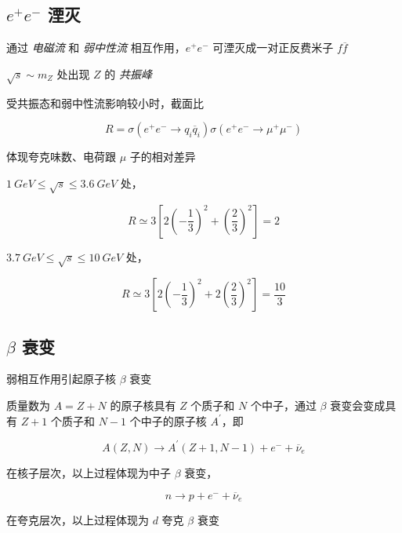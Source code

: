 \documentclass[oneside,a4paper,openany,11pt]{ctexbook}
\begin{document}
\subsection{\texorpdfstring{$e^+e^-$}{e+e-} 湮灭}

通过 \emph{电磁流} 和 \emph{弱中性流} 相互作用，$e^+ e^-$ 可湮灭成一对正反费米子 $f \overline{f}$

$\sqrt{s} \sim m_Z$ 处出现 $Z$ 的 \emph{共振峰}

受共振态和弱中性流影响较小时，截面比

\begin{equation}
    R = \sigma(e^+ e^- \to q_i \overline{q}_i ) \sigma(e^+ e^- \to \mu^+ \mu^-)
\end{equation}

体现夸克味数、电荷跟 $\mu$ 子的相对差异

$1\ GeV \le \sqrt{s} \le 3.6\ GeV$ 处，

\begin{equation}
    R \simeq 3 \left[2  \left(-\frac{1}{3}\right)^2 +  \left(\frac{2}{3}\right)^2 \right] = 2
\end{equation}

$3.7\ GeV \le \sqrt{s} \le 10\ GeV$ 处，

\begin{equation}
    R \simeq 3 \left[2 \left(-\frac{1}{3}\right)^2 +  2 \left(\frac{2}{3}\right)^2 \right] = \frac{10}{3}
\end{equation}

\subsection{\texorpdfstring{$\beta$}{beta} 衰变}

弱相互作用引起原子核 $\beta$ 衰变

质量数为 $A=Z+N$ 的原子核具有 $Z$ 个质子和 $N$ 个中子，通过 $\beta$ 衰变会变成具有 $Z+1$ 个质子和 $N-1$ 个中子的原子核 $A^\prime$，即

\begin{equation}
    A(Z, N) \to A^\prime(Z+1, N-1) + e^- + \overline{\nu}_e
\end{equation}

在核子层次，以上过程体现为中子 $\beta$ 衰变，

\begin{equation}
    n \to p + e^- + \overline{\nu}_e
\end{equation}

在夸克层次，以上过程体现为 $d$ 夸克 $\beta$ 衰变
\end{document}
